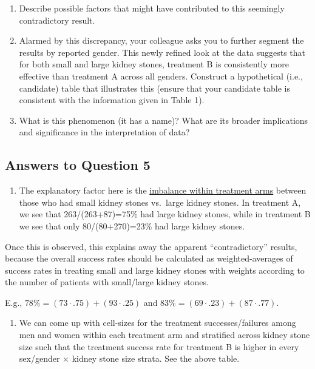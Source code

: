 \documentclass[
  letterpaper,
  DIV=11,
  numbers=noendperiod]{scrartcl}
\providecommand{\tightlist}{%
  \setlength{\itemsep}{0pt}\setlength{\parskip}{0pt}}\usepackage{longtable,booktabs,array}
\begin{document}
\begin{enumerate}
\def\labelenumi{\alph{enumi})}
\item
  Describe possible factors that might have contributed to this
  seemingly contradictory result.
\item
  Alarmed by this discrepancy, your colleague asks you to further
  segment the results by reported gender. This newly refined look at the
  data suggests that for both small and large kidney stones, treatment B
  is consistently more effective than treatment A across all genders.
  Construct a hypothetical (i.e., candidate) table that illustrates this
  (ensure that your candidate table is consistent with the information
  given in Table 1).
\item
  What is this phenomenon (it has a name)? What are its broader
  implications and significance in the interpretation of data?
\end{enumerate}

\hypertarget{answers-to-question-5}{%
\subsection{Answers to Question 5}\label{answers-to-question-5}}

\begin{enumerate}
\def\labelenumi{\alph{enumi})}
\tightlist
\item
  The explanatory factor here is the
  \underline{imbalance within treatment arms} between those who had
  small kidney stones vs.~large kidney stones. In treatment A, we see
  that 263/(263+87)=75\% had large kidney stones, while in treatment B
  we see that only 80/(80+270)=23\% had large kidney stones.
\end{enumerate}

Once this is observed, this explains away the apparent ``contradictory''
results, because the overall success rates should be calculated as
weighted-averages of success rates in treating small and large kidney
stones with weights according to the number of patients with small/large
kidney stones.

E.g., \(78\% = (73 \cdot .75) + (93 \cdot .25)\) and
\(83\% = (69 \cdot .23) + (87 \cdot .77)\).

\begin{enumerate}
\def\labelenumi{\alph{enumi})}
\setcounter{enumi}{1}
\tightlist
\item
  We can come up with cell-sizes for the treatment successes/failures
  among men and women within each treatment arm and stratified across
  kidney stone size such that the treatment success rate for treatment B
  is higher in every sex/gender \(\times\) kidney stone size strata. See
  the above table.
\end{enumerate}
\end{document}
